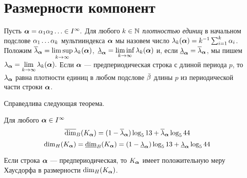 \section{Размерности компонент}
\setcounter{equation}{0}

Пусть ${\bm{\alpha}}=\alpha_1 \alpha_2 \ldots\in I^\infty.$ Для любого $k \in\mathbb{N}$ {\em плотностью единиц} в начальном подслове $\alpha_{1}\ldots\alpha_{k}$ мультииндекса ${\bm{\alpha}}$ мы назовем число $\lambda_{k}({\bm{\alpha}})=k^{-1}\sum_{i=1}^k\alpha_i$. Положим $\overline{\lambda}_{\bm{\alpha}}=\limsup\limits_{k\to\infty}{\lambda_{k}({\bm{\alpha}})}$,\ $\underline{\lambda}_{\bm{\alpha}}=\liminf\limits_{k\to\infty}{\lambda_{k}({\bm{\alpha}})}$ и, если $\underline{\lambda}_{\bm{\alpha}}=\overline{\lambda}_{\bm{\alpha}}$, мы пишем $\lambda_{\bm{\alpha}}=\lim\limits_{k\to\infty}{\lambda_{k}({\bm{\alpha}})}.$ Если ${\bm{\alpha}}$ --- предпериодическая строка с длиной периода $p$, то $\lambda_{\bm{\alpha}}$ равна плотности единиц в любом подслове $\bar{\beta}$ длины $p$ из периодической части строки ${\bm{\alpha}}$.\smallskip

Справедлива  следующая  теорема.
\begin{theorem}\label{tdim}
Для любого ${\bm{\alpha}}\in I^\infty$
$$\overline{\dim}_B(K_{\bm{\alpha}})=(1-\overline{\lambda}_{\bm{\alpha}})\log_513+\overline{\lambda}_{\bm{\alpha}}\log_544$$
$$\dim_H(K_{\bm{\alpha}})=\underline{\dim}_B(K_{\bm{\alpha}})=(1-\underline{\lambda}_{\bm{\alpha}})\log_513+\underline{\lambda}_{\bm{\alpha}}\log_544$$

Если строка ${\bm{\alpha}}$ --- предпериодическая, то $K_{\bm{\alpha}}$ имеет положительную меру Хаусдорфа в размерности $\dim_H(K_{\bm{\alpha}})$.
\end{theorem}

